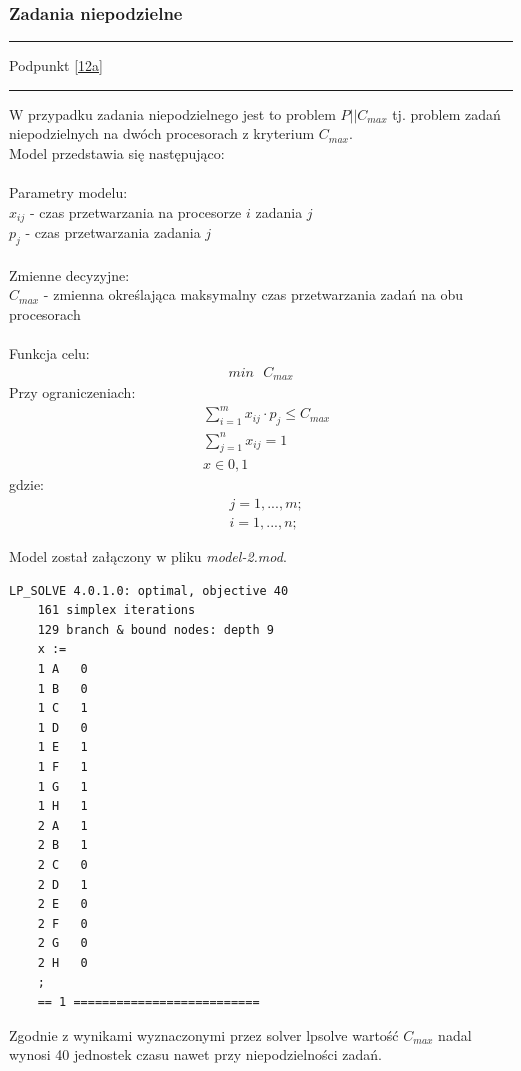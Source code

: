 \documentclass[
    12pt, %
]{../fphw}
\begin{document}
\subsubsection{Zadania niepodzielne}
\par\noindent\rule{\textwidth}{0.4pt}
Podpunkt \ref{12a}
\par\noindent\rule{\textwidth}{0.4pt}
W przypadku zadania niepodzielnego jest to problem \(P||C_{max}\)
tj. problem zadań niepodzielnych na dwóch procesorach z kryterium \(C_{max}\). \\
Model przedstawia się następująco: \\ \\
Parametry modelu: \\
\(x_{ij}\) - czas przetwarzania na procesorze \(i\) zadania \(j\) \\
\(p_j\) - czas przetwarzania zadania \(j\) \\ \\
Zmienne decyzyjne: \\
\(C_{max}\) - zmienna określająca maksymalny czas przetwarzania zadań na obu procesorach \\ \\
Funkcja celu: \\
\begin{align*}
    min \text{ } C_{max}
\end{align*}
\newpage
Przy ograniczeniach: \\
\begin{align*}
     & \sum^m_{i=1}x_{ij} \cdot p_j \leq C_{max} \\
     & \sum^n_{j=1}x_{ij} = 1                    \\
     & x \in  {0,1}
\end{align*}
gdzie:
\begin{align*}
     & j = 1, ..., m; \\
     & i = 1, ..., n;
\end{align*}


Model został załączony w pliku \textit{model-2.mod}.

\begin{lstlisting}[caption=Rozwiązanie znalezione solwerem lpsolve]
    LP_SOLVE 4.0.1.0: optimal, objective 40
    161 simplex iterations
    129 branch & bound nodes: depth 9
    x :=
    1 A   0
    1 B   0
    1 C   1
    1 D   0
    1 E   1
    1 F   1
    1 G   1
    1 H   1
    2 A   1
    2 B   1
    2 C   0
    2 D   1
    2 E   0
    2 F   0
    2 G   0
    2 H   0
    ;
    == 1 ==========================
\end{lstlisting}
Zgodnie z wynikami wyznaczonymi przez solver lpsolve wartość \(C_{max}\) nadal wynosi 40 jednostek czasu
nawet przy niepodzielności zadań.
\end{document}
